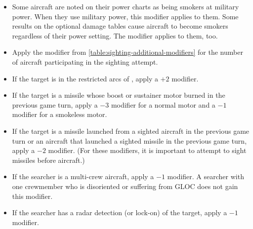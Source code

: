 {\begin{itemize}
    
    \item {} 
     Some aircraft are noted on their power charts as being smokers at military power. When they use military power, this modifier applies to them. Some results on the optional damage tables cause aircraft to become smokers regardless of their power setting. The modifier applies to them, too.
    \item {} Apply the modifier from \ref{table:sighting-additional-modifiers} for the number of aircraft participating in the sighting attempt. 
    \item {} If the target is in the restricted arcs of , apply a $+2$ modifier.
    \item {} If the target is a missile whose boost or sustainer motor burned in the previous game turn, apply a $-3$ modifier for a normal motor and a $-1$ modifier for a smokeless motor.
    \item {} If the target is a missile launched from a sighted aircraft in the previous game turn or an aircraft that launched a sighted missile in the previous game turn, apply a $-2$ modifier. (For these modifiers, it is important to attempt to sight missiles before aircraft.)
    \item {} If the searcher is a multi-crew aircraft, apply a $-1$ modifier. A searcher with one crewmember who is disoriented or suffering from GLOC does not gain this modifier.
    \item{} If the searcher has a radar detection (or lock-on) of the target, apply a $-1$ modifier.


\end{itemize}}
